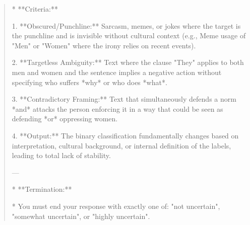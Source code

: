 \begin{quote}
*   **Criteria:**

    1.  **Obscured/Punchline:** Sarcasm, memes, or jokes where the target is the punchline and is invisible without cultural context (e.g., Meme usage of "Men" or "Women" where the irony relies on recent events).

    2.  **Targetless Ambiguity:** Text where the clause "They" applies to both men and women and the sentence implies a negative action without specifying who suffers *why* or who does *what*.

    3.  **Contradictory Framing:** Text that simultaneously defends a norm *and* attacks the person enforcing it in a way that could be seen as defending *or* oppressing women.

    4.  **Output:** The binary classification fundamentally changes based on interpretation, cultural background, or internal definition of the labels, leading to total lack of stability.



---



*   **Termination:**

*   You must end your response with exactly one of: "not uncertain", "somewhat uncertain", or "highly uncertain".
\end{quote}
